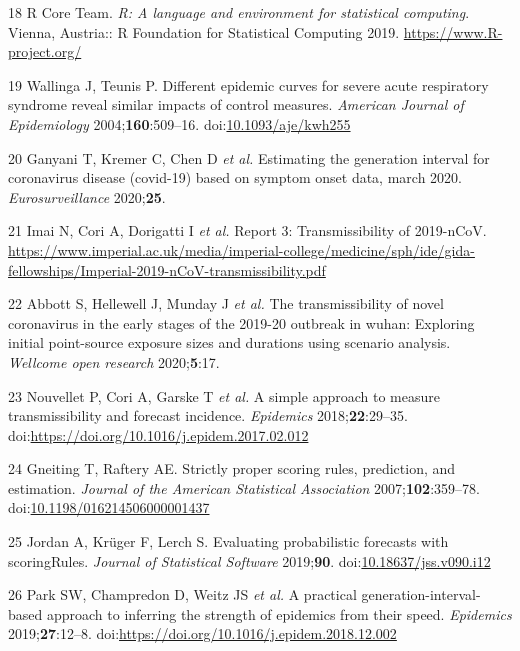 \documentclass[
]{article}
\begin{document}
\leavevmode\hypertarget{ref-R}{}%
18 R Core Team. \emph{R: A language and environment for statistical
computing}. Vienna, Austria:: R Foundation for Statistical Computing
2019. \url{https://www.R-project.org/}

\leavevmode\hypertarget{ref-wallinga2004}{}%
19 Wallinga J, Teunis P. Different epidemic curves for severe acute
respiratory syndrome reveal similar impacts of control measures.
\emph{American Journal of Epidemiology} 2004;\textbf{160}:509--16.
doi:\href{https://doi.org/10.1093/aje/kwh255}{10.1093/aje/kwh255}

\leavevmode\hypertarget{ref-generationinterval}{}%
20 Ganyani T, Kremer C, Chen D \emph{et al.} Estimating the generation
interval for coronavirus disease (covid-19) based on symptom onset data,
march 2020. \emph{Eurosurveillance} 2020;\textbf{25}.

\leavevmode\hypertarget{ref-Imai:webreport3}{}%
21 Imai N, Cori A, Dorigatti I \emph{et al.} Report 3: Transmissibility
of 2019-nCoV.
\url{https://www.imperial.ac.uk/media/imperial-college/medicine/sph/ide/gida-fellowships/Imperial-2019-nCoV-transmissibility.pdf}

\leavevmode\hypertarget{ref-Abbott:2020hj}{}%
22 Abbott S, Hellewell J, Munday J \emph{et al.} The transmissibility of
novel coronavirus in the early stages of the 2019-20 outbreak in wuhan:
Exploring initial point-source exposure sizes and durations using
scenario analysis. \emph{Wellcome open research} 2020;\textbf{5}:17.

\leavevmode\hypertarget{ref-NOUVELLET201829}{}%
23 Nouvellet P, Cori A, Garske T \emph{et al.} A simple approach to
measure transmissibility and forecast incidence. \emph{Epidemics}
2018;\textbf{22}:29--35.
doi:\href{https://doi.org/https://doi.org/10.1016/j.epidem.2017.02.012}{https://doi.org/10.1016/j.epidem.2017.02.012}

\leavevmode\hypertarget{ref-gneiting_strictly_2007}{}%
24 Gneiting T, Raftery AE. Strictly proper scoring rules, prediction,
and estimation. \emph{Journal of the American Statistical Association}
2007;\textbf{102}:359--78.
doi:\href{https://doi.org/10.1198/016214506000001437}{10.1198/016214506000001437}

\leavevmode\hypertarget{ref-jordan_evaluating_2019}{}%
25 Jordan A, Krüger F, Lerch S. Evaluating probabilistic forecasts with
scoringRules. \emph{Journal of Statistical Software} 2019;\textbf{90}.
doi:\href{https://doi.org/10.18637/jss.v090.i12}{10.18637/jss.v090.i12}

\leavevmode\hypertarget{ref-Park2019}{}%
26 Park SW, Champredon D, Weitz JS \emph{et al.} A practical
generation-interval-based approach to inferring the strength of
epidemics from their speed. \emph{Epidemics} 2019;\textbf{27}:12--8.
doi:\href{https://doi.org/https://doi.org/10.1016/j.epidem.2018.12.002}{https://doi.org/10.1016/j.epidem.2018.12.002}
\end{document}
